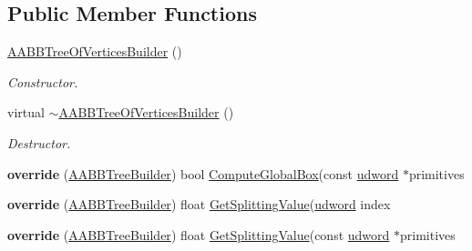 \subsection*{Public Member Functions}
\begin{DoxyCompactItemize}
\item 
\hyperlink{classAABBTreeOfVerticesBuilder_a8f78a7745ee4112b13dc5c8dba347787}{A\+A\+B\+B\+Tree\+Of\+Vertices\+Builder} ()\hypertarget{classAABBTreeOfVerticesBuilder_a8f78a7745ee4112b13dc5c8dba347787}{}\label{classAABBTreeOfVerticesBuilder_a8f78a7745ee4112b13dc5c8dba347787}

\begin{DoxyCompactList}\small\item\em Constructor. \end{DoxyCompactList}\item 
virtual \hyperlink{classAABBTreeOfVerticesBuilder_a05cabae50a1583e106430952b7e2d3a5}{$\sim$\+A\+A\+B\+B\+Tree\+Of\+Vertices\+Builder} ()\hypertarget{classAABBTreeOfVerticesBuilder_a05cabae50a1583e106430952b7e2d3a5}{}\label{classAABBTreeOfVerticesBuilder_a05cabae50a1583e106430952b7e2d3a5}

\begin{DoxyCompactList}\small\item\em Destructor. \end{DoxyCompactList}\item 
{\bfseries override} (\hyperlink{classAABBTreeBuilder}{A\+A\+B\+B\+Tree\+Builder}) bool \hyperlink{classAABBTreeBuilder_adde85a9974ea5dc2c74fd851e11abf75}{Compute\+Global\+Box}(const \hyperlink{IceTypes_8h_a44c6f1920ba5551225fb534f9d1a1733}{udword} $\ast$primitives\hypertarget{classAABBTreeOfVerticesBuilder_ad942b8962dc32f7a550bf47b18d8a7d7}{}\label{classAABBTreeOfVerticesBuilder_ad942b8962dc32f7a550bf47b18d8a7d7}

\item 
{\bfseries override} (\hyperlink{classAABBTreeBuilder}{A\+A\+B\+B\+Tree\+Builder}) float \hyperlink{classAABBTreeBuilder_acf08d2d4275763e25585aa240e641be1}{Get\+Splitting\+Value}(\hyperlink{IceTypes_8h_a44c6f1920ba5551225fb534f9d1a1733}{udword} index\hypertarget{classAABBTreeOfVerticesBuilder_a62330aaeef2a801fcaba42c51f3a7b4a}{}\label{classAABBTreeOfVerticesBuilder_a62330aaeef2a801fcaba42c51f3a7b4a}

\item 
{\bfseries override} (\hyperlink{classAABBTreeBuilder}{A\+A\+B\+B\+Tree\+Builder}) float \hyperlink{classAABBTreeBuilder_acf08d2d4275763e25585aa240e641be1}{Get\+Splitting\+Value}(const \hyperlink{IceTypes_8h_a44c6f1920ba5551225fb534f9d1a1733}{udword} $\ast$primitives\hypertarget{classAABBTreeOfVerticesBuilder_a3d1643101d9f06f6ec1a24646b9ecea5}{}\label{classAABBTreeOfVerticesBuilder_a3d1643101d9f06f6ec1a24646b9ecea5}

\end{DoxyCompactItemize}
